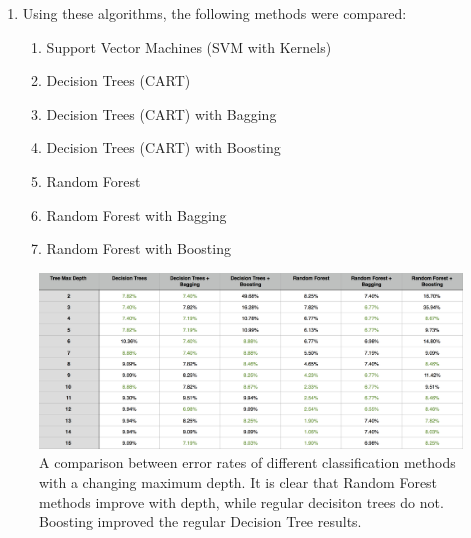 \documentclass[10pt,twocolumn]{article}
\begin{document}
\begin{enumerate}
    \item Using these algorithms, the following methods were compared:
    \begin{enumerate}
      \item Support Vector Machines (SVM with Kernels)
      \item Decision Trees (CART)
      \item Decision Trees (CART) with Bagging
      \item Decision Trees (CART) with Boosting
      \item Random Forest
      \item Random Forest with Bagging
      \item Random Forest with Boosting
    \end{enumerate}

\end{enumerate}

\begin{figure}[!t]
  \begin{center}
    \includegraphics[width=5.8in]{../plots/table_depth.png}
  \end{center}
  \caption{\small A comparison between error rates of different classification methods with a changing maximum depth. It is clear that Random Forest methods improve with depth, while regular decisiton trees do not.\\Boosting improved the regular Decision Tree results.}
  \label{table-depth}
\end{figure}
\end{document}
